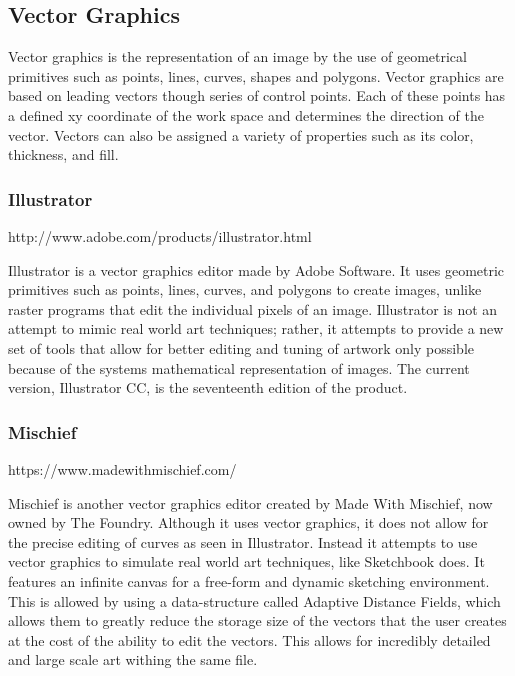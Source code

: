 \documentclass[12pt]{report}
\begin{document}
\pagebreak

\subsection{Vector Graphics}

Vector graphics is the representation of an image by the use of geometrical primitives such as points, lines, curves, shapes and polygons. 
Vector graphics are based on leading vectors though series of control points. Each of these points has a defined xy coordinate of the work space and determines the direction of the vector. 
Vectors can also be assigned a variety of properties such as its color, thickness, and fill. 



\subsubsection{Illustrator} http://www.adobe.com/products/illustrator.html

Illustrator is a vector graphics editor made by Adobe Software. It uses geometric primitives such as points, lines, curves, and polygons to create images, unlike raster programs that edit the individual pixels of an image. Illustrator is not an attempt to mimic real world art techniques; rather, it attempts to provide a new set of tools that allow for better editing and tuning of artwork only possible because of the systems mathematical representation of images. The current version, Illustrator CC, is the seventeenth edition of the product.

\subsubsection{Mischief} https://www.madewithmischief.com/

Mischief is another vector graphics editor created by Made With Mischief, now owned by The Foundry. Although it uses vector graphics, it does not allow for the precise editing of curves as seen in Illustrator. Instead it attempts to use vector graphics to simulate real world art techniques, like Sketchbook does. It features an infinite canvas for a free-form and dynamic sketching environment. This is allowed by using a data-structure called Adaptive Distance Fields, which allows them to greatly reduce the storage size of the vectors that the user creates at the cost of the ability to edit the vectors. This allows for incredibly detailed and large scale art withing the same file.
\end{document}

